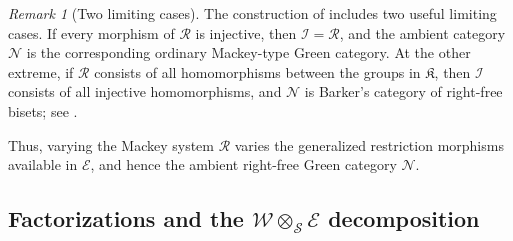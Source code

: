 \documentclass{amsart}
\numberwithin{equation}{section}%
\theoremstyle{remark}
\newtheorem{Rem}[equation]{Remark}
\theoremstyle{definition}
\begin{document}
\begin{Rem}[Two limiting cases]
\label{rem:four-group-categories-examples}
The construction of  includes two
useful limiting cases.
If every morphism of $\mathcal R$ is injective, then
$\mathcal I=\mathcal R$, and the ambient category $\mathcal N$ is the
corresponding ordinary Mackey-type Green category.
At the other extreme, if $\mathcal R$ consists of all homomorphisms
between the groups in $\mathfrak K$, then $\mathcal I$ consists of all
injective homomorphisms, and $\mathcal N$ is Barker's category of
right-free bisets; see \cite[Ex.~2.6]{Barker16b}.

Thus, varying the Mackey system $\mathcal R$ varies the generalized
restriction morphisms available in $\mathcal E$, and hence the ambient
right-free Green category $\mathcal N$.
\end{Rem}

%
\subsection{Factorizations and the $\mathcal W\otimes_{\mathcal S}\mathcal E$ decomposition}\
\label{ssec:WE-decomposition}
%
\end{document}
